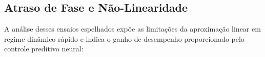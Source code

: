 \begin{table}[H]
    \centering
    \caption{Comparação de desempenho (RMSE) entre o PID Linear e o Controlador Neural (100\% ANN) na bancada real.}
    \label{tab:desempenho_rodada7}
    \par\vspace{1.5ex}
\end{table}

\subsection{Atraso de Fase e Não-Linearidade}

A análise desses ensaios espelhados expõe as limitações da aproximação linear em regime dinâmico rápido e indica o ganho de desempenho proporcionado pelo controle preditivo neural:

